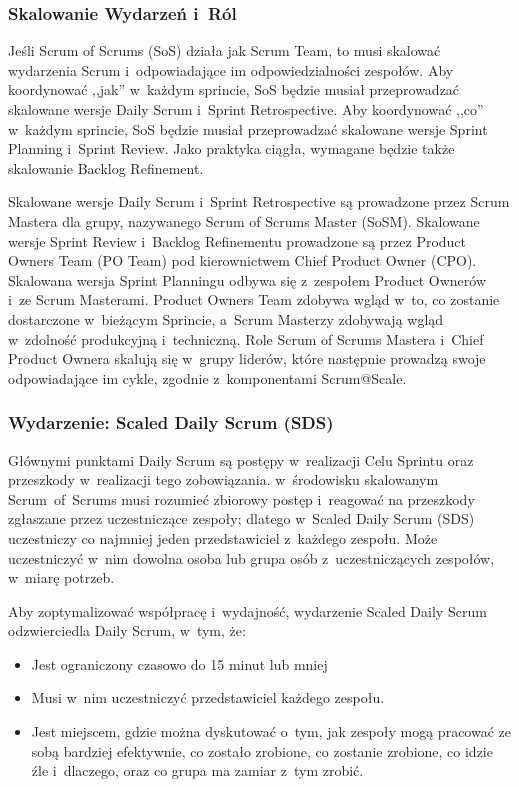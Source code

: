 \documentclass[12pt,a4paper,parskip=full]{scrartcl}
\begin{document}
\subsubsection{Skalowanie Wydarzeń i~Ról}\label{scaling-the-events-and-roles}

Jeśli Scrum of Scrums (SoS) działa jak Scrum Team, to musi skalować wydarzenia Scrum i~odpowiadające im odpowiedzialności zespołów. Aby koordynować ,,jak'' w~każdym sprincie, SoS będzie musiał przeprowadzać skalowane wersje Daily Scrum i~Sprint Retrospective. Aby koordynować ,,co'' w~każdym sprincie, SoS będzie musiał przeprowadzać skalowane wersje Sprint Planning i~Sprint Review. Jako praktyka ciągła, wymagane będzie także skalowanie Backlog Refinement.

Skalowane wersje Daily Scrum i~Sprint Retrospective są prowadzone przez Scrum Mastera dla grupy, nazywanego Scrum of Scrums Master (SoSM). Skalowane wersje Sprint Review i~Backlog Refinementu prowadzone są przez Product Owners Team (PO Team) pod kierownictwem Chief Product Owner (CPO). Skalowana wersja Sprint Planningu odbywa się z~zespołem Product Ownerów i~ze Scrum Masterami. Product Owners Team zdobywa wgląd w~to, co zostanie dostarczone w~bieżącym Sprincie, a~Scrum Masterzy zdobywają wgląd w~zdolność produkcyjną i~techniczną. Role Scrum of Scrums Mastera i~Chief Product Ownera skalują się w~grupy liderów, które następnie prowadzą swoje odpowiadające im cykle, zgodnie z~komponentami Scrum@Scale.

\subsubsection{Wydarzenie: Scaled Daily Scrum (SDS)}\label{event-the-scaled-daily-scrum}

Głównymi punktami Daily Scrum są postępy w~realizacji Celu Sprintu oraz prze\-szko\-dy w~realizacji tego zobowiązania. w~środowisku skalowanym Scrum\ of\ Scrums musi rozumieć zbiorowy postęp i~reagować na przeszkody zgłaszane przez uczestniczące zespoły; dlatego w~Scaled Daily Scrum (SDS) uczestniczy co najmniej jeden przedstawiciel z~każdego zespołu. Może uczestniczyć w~nim dowolna osoba lub grupa osób z~uczestniczących zespołów, w~miarę potrzeb.

Aby zoptymalizować współpracę i~wydajność, wydarzenie Scaled Daily Scrum odzwierciedla Daily Scrum, w~tym, że:

\begin{itemize}
\itemsep1pt\parskip0pt
\item
  Jest ograniczony czasowo do 15 minut lub mniej
\item
  Musi w~nim uczestniczyć przedstawiciel każdego zespołu.
\item
  Jest miejscem, gdzie można dyskutować o~tym, jak zespoły mogą pracować ze sobą bardziej efektywnie, co zostało zrobione, co zostanie zrobione, co idzie źle i~dlaczego, oraz co grupa ma zamiar z~tym zrobić.
\end{itemize}
\end{document}
